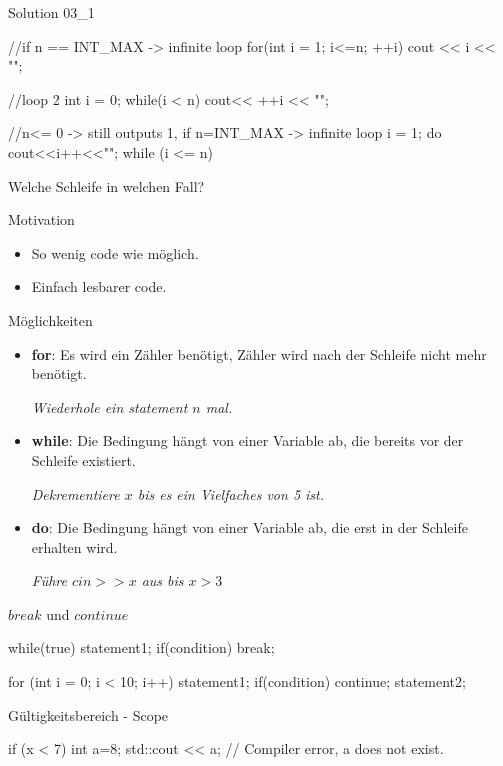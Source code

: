 \ifnum\conditionmacro=1 \documentclass[handout,usenames,dvipsnames]{beamer}\fi
\begin{document}
\begin{frame}[fragile]{Solution 03\_1}
\begin{TFCpp}
//if n == INT_MAX -> infinite loop
for(int i = 1; i<=n; ++i)
	cout << i << "\n";
	
//loop 2
int i = 0;
while(i < n)
	cout<< ++i << "\n";
	
//n<= 0 -> still outputs 1, if n=INT_MAX -> infinite loop
i = 1;
do
	cout<<i++<<"\n";
while (i <= n)
\end{TFCpp}
\end{frame}

\begin{frame}{Welche Schleife in welchen Fall?}
\begin{block}{Motivation}
\begin{itemize}
\item So wenig code wie möglich.
\item Einfach lesbarer code.
\end{itemize}
\end{block}
\begin{block}{Möglichkeiten}
\begin{itemize}
\item \textbf{for}: Es wird ein Zähler benötigt, Zähler wird nach der Schleife nicht mehr benötigt.

\emph{Wiederhole ein statement $n$ mal.}
\item \textbf{while}: Die Bedingung hängt von einer Variable ab, die bereits vor der Schleife existiert.

\emph{Dekrementiere $x$ bis es ein Vielfaches von 5 ist.}
\item \textbf{do}: Die Bedingung hängt von einer Variable ab, die erst in der Schleife erhalten wird.

\emph{Führe $cin>>x$ aus bis $x>3$}
\end{itemize}
\end{block}
\end{frame}

\begin{frame}[fragile]{$break$ und $continue$}
\begin{TFCpp}
while(true){
	statement1;
	if(condition){
		break;
	}
}

for (int i = 0; i < 10; i++){
	statement1;
	if(condition){
		continue;
	}
	statement2;
}
\end{TFCpp}
\end{frame}

\begin{frame}[fragile]{Gültigkeitsbereich - Scope}
\begin{TFCpp}
if (x < 7) {
int a=8;
}
std::cout << a; // Compiler error, a does not exist.
\end{TFCpp}
\end{frame}
\end{document}
